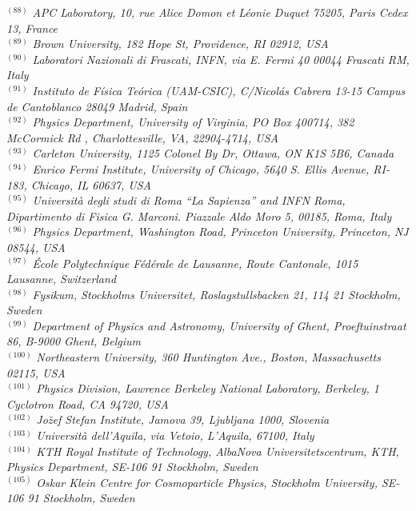 {\begin{center}
$^{(88)}$ \emph{APC Laboratory, 10, rue Alice Domon et L\'eonie Duquet 75205, Paris Cedex 13, France}\\
$^{(89)}$ \emph{Brown University, 182 Hope St, Providence, RI 02912, USA}\\
$^{(90)}$ \emph{Laboratori Nazionali di Frascati, INFN, via E. Fermi 40 00044 Frascati RM, Italy}\\
$^{(91)}$ \emph{Instituto de F\'isica Te\'orica (UAM-CSIC), C/Nicol\'as Cabrera 13-15 Campus de Cantoblanco 28049 Madrid, Spain}\\
$^{(92)}$ \emph{Physics Department, University of Virginia,  PO Box 400714, 382 McCormick Rd ,  Charlottesville, VA, 22904-4714, USA}\\
$^{(93)}$ \emph{Carleton University, 1125 Colonel By Dr, Ottawa, ON K1S 5B6, Canada}\\
$^{(94)}$ \emph{Enrico Fermi Institute, University of Chicago, 5640 S. Ellis Avenue, RI-183, Chicago, IL 60637, USA}\\
$^{(95)}$ \emph{Universit\`a degli studi di Roma ``La Sapienza'' and INFN Roma, Dipartimento di Fisica G. Marconi. Piazzale Aldo Moro 5, 00185, Roma, Italy}\\
$^{(96)}$ \emph{Physics Department, Washington Road, Princeton University, Princeton, NJ 08544, USA}\\
$^{(97)}$ \emph{\'Ecole Polytechnique F\'ed\'erale de Lausanne, Route Cantonale, 1015 Lausanne, Switzerland}\\
$^{(98)}$ \emph{Fysikum, Stockholms Universitet, Roslagstullsbacken 21, 114 21 Stockholm, Sweden}\\
$^{(99)}$ \emph{Department of Physics and Astronomy, University of Ghent, Proeftuinstraat 86, B-9000 Ghent, Belgium}\\
$^{(100)}$ \emph{Northeastern University, 360 Huntington Ave., Boston, Massachusetts 02115, USA}\\
$^{(101)}$ \emph{Physics Division, Lawrence Berkeley National Laboratory, Berkeley, 1 Cyclotron Road, CA 94720, USA}\\
$^{(102)}$ \emph{Jo\u zef Stefan Institute, Jamova 39, Ljubljana 1000, Slovenia}\\
$^{(103)}$ \emph{Universit\`a dell'Aquila, via Vetoio, L'Aquila, 67100, Italy}\\
$^{(104)}$ \emph{KTH Royal Institute of Technology, AlbaNova Universitetscentrum, KTH, Physics Department, SE-106 91 Stockholm, Sweden}\\
$^{(105)}$ \emph{Oskar Klein Centre for Cosmoparticle Physics, Stockholm University, SE-106 91 Stockholm, Sweden}\\

\end{center}}
